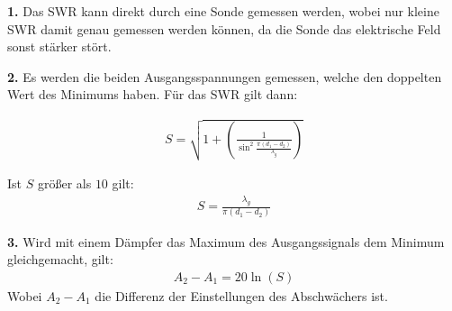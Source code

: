 \textbf{1.} Das SWR kann direkt durch eine Sonde gemessen werden, wobei nur kleine SWR
damit genau gemessen werden können, da die Sonde das elektrische Feld sonst stärker
stört.

\textbf{2.} Es werden die beiden Ausgangsspannungen gemessen, welche den doppelten Wert
des Minimums haben. Für das SWR gilt dann:

\begin{align}
  S = \sqrt{1+  \left(\frac{1}{\sin^2{ \frac{\pi(d_1 - d_2)}{\lambda_g} }} \right) }
\end{align}

Ist $S$ größer als $10$ gilt:
\begin{align}
  S = \frac{\lambda_g}{\pi(d_1-d_2)}
\end{align}

\textbf{3.} Wird mit einem Dämpfer das Maximum des Ausgangssignals dem Minimum gleichgemacht, gilt:
\begin{align}
  A_2 - A_1 = 20 \ln(S)
\end{align}
Wobei $A_2 - A_1$ die Differenz der Einstellungen des Abschwächers ist.
